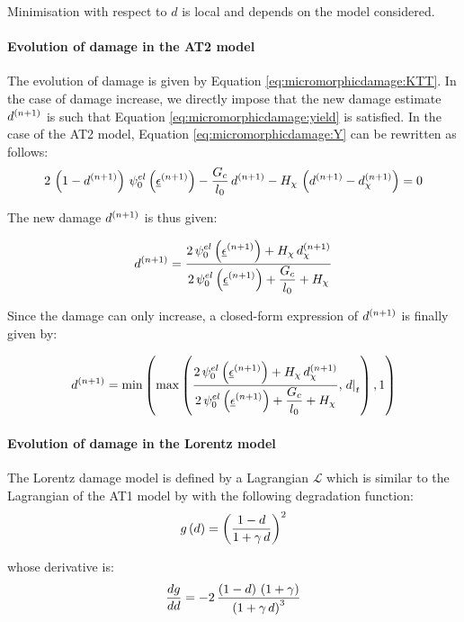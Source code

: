 Minimisation with respect to \(d\) is local and depends on the model
considered.

\paragraph{Evolution of damage in the AT2 model}

The evolution of damage is given by Equation
\eqref{eq:micromorphicdamage:KTT}. In the case of damage increase, we
directly impose that the new damage estimate \(\iter{n+1}{d}\) is such
that Equation \eqref{eq:micromorphicdamage:yield} is satisfied. In the
case of the AT2 model, Equation \eqref{eq:micromorphicdamage:Y} can be
rewritten as follows:
\[
2\,\paren{1-\iter{n+1}{d}}\,\freeenergyel_{0}\paren{\iter{n+1}{\tepsilon}}-\Frac{G_{c}}{l_{0}}\,\iter{n+1}{d}-H_{\chi}\,\paren{\iter{n+1}{d}-\iter{n+1}{d_{\chi}}}=0
\]

The new damage \(\iter{n+1}{d}\) is thus given:

\begin{equation}
\label{eq:micromorphicdamage:damage_estimate0}
\iter{n+1}{d}=
\Frac{2\,\freeenergyel_{0}\paren{\iter{n+1}{\tepsilon}}+H_{\chi}\,\iter{n+1}{d_{\chi}}}{2\,\freeenergyel_{0}\paren{\iter{n+1}{\tepsilon}}+\Frac{G_{c}}{l_{0}}+H_{\chi}}
\end{equation}

Since the damage can only increase, a closed-form expression of
\(\iter{n+1}{d}\) is finally given by:

\begin{equation}
\label{eq:micromorphicdamage:damage_estimate}
\iter{n+1}{d}=
\min\paren{\max\paren{
\Frac{2\,\freeenergyel_{0}\paren{\iter{n+1}{\tepsilon}}+H_{\chi}\,\iter{n+1}{d_{\chi}}}{2\,\freeenergyel_{0}\paren{\iter{n+1}{\tepsilon}}+\Frac{G_{c}}{l_{0}}+H_{\chi}},\bts{d}},1}
\end{equation}

\paragraph{Evolution of damage in the Lorentz model}

The Lorentz damage model is defined by a Lagrangian \(\mathcal{L}\)
which is similar to the Lagrangian of the AT1 model by with the
following degradation function:
\[
g\paren{d}=\paren{\Frac{1-d}{1+\gamma\,d}}^{2}
\]

whose derivative is:
\[
\derivtot{g}{d}=-2\,\Frac{\paren{1-d}\,\paren{1+\gamma}}{\paren{1+\gamma\,d}^{3}}
\]


